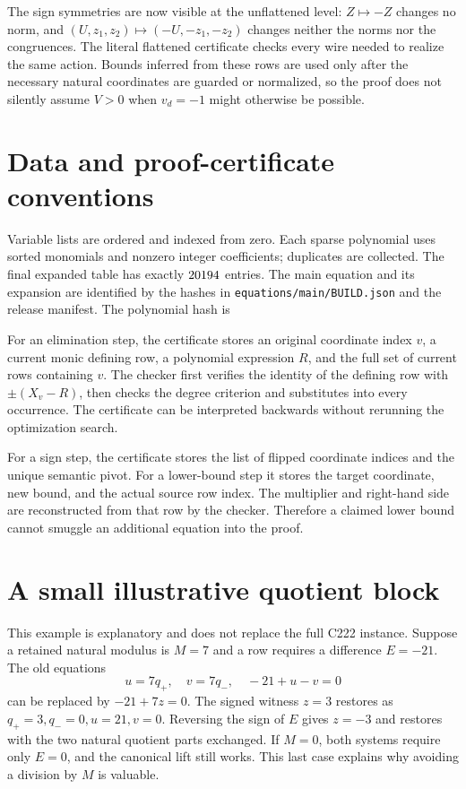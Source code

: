 \documentclass[11pt,letterpaper]{article}
\theoremstyle{definition}
\begin{document}
The sign symmetries are now visible at the unflattened level:
$Z\mapsto-Z$ changes no norm, and
$(U,z_1,z_2)\mapsto(-U,-z_1,-z_2)$ changes neither the norms nor the
congruences. The literal flattened certificate checks every wire
needed to realize the same action. Bounds inferred from these rows
are used only after the necessary natural coordinates are guarded or
normalized, so the proof does not silently assume $V>0$ when
$v_d=-1$ might otherwise be possible.

\section{Data and proof-certificate conventions}

Variable lists are ordered and indexed from zero. Each sparse polynomial
uses sorted monomials and nonzero integer coefficients; duplicates are
collected. The final expanded table has exactly $20194$ entries.
The main equation and its expansion are identified by the hashes in
\texttt{equations/main/BUILD.json} and the release manifest. The
polynomial hash is
\begin{center}\small\ttfamily\MainPolynomialHash\end{center}

For an elimination step, the certificate stores an original coordinate
index $v$, a current monic defining row, a polynomial expression $R$,
and the full set of current rows containing $v$. The checker first
verifies the identity of the defining row with $\pm(X_v-R)$, then
checks the degree criterion and substitutes into every occurrence.
The certificate can be interpreted backwards without rerunning the
optimization search.

For a sign step, the certificate stores the list of flipped coordinate
indices and the unique semantic pivot. For a lower-bound step it stores
the target coordinate, new bound, and the actual source row index.
The multiplier and right-hand side are reconstructed from that row by
the checker. Therefore a claimed lower bound cannot smuggle an
additional equation into the proof.

\section{A small illustrative quotient block}

This example is explanatory and does not replace the full C222 instance.
Suppose a retained natural modulus is $M=7$ and a row requires a
difference $E=-21$. The old equations
\[
u=7q_+,\quad v=7q_-,\quad -21+u-v=0
\]
can be replaced by $-21+7z=0$. The signed witness $z=3$ restores as
$q_+=3,q_-=0,u=21,v=0$. Reversing the sign of $E$ gives $z=-3$ and
restores with the two natural quotient parts exchanged. If $M=0$,
both systems require only $E=0$, and the canonical lift still works.
This last case explains why avoiding a division by $M$ is valuable.
\end{document}
